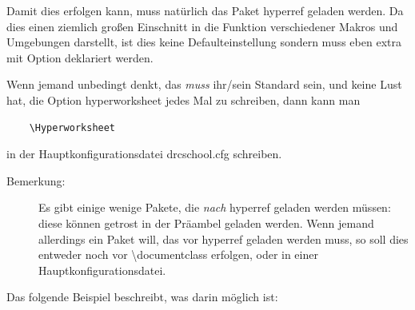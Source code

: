 \documentclass[hyperworksheet,pgfplots]{drcschool}
\newcommand*{\cs}[1]{\textup{\ttfamily\textbackslash#1}}                   %
\newcommand*{\pkg}[1]{\textup{\ttfamily#1}}                                %
\newcommand*{\opt}[1]{\textup{\ttfamily#1}}                                %
\begin{document}
Damit dies erfolgen kann, muss natürlich das Paket \pkg{hyperref} geladen werden.
Da dies einen ziemlich großen Einschnitt in die Funktion verschiedener Makros und Umgebungen
darstellt, ist dies keine Defaulteinstellung sondern muss eben extra mit Option deklariert
werden.

Wenn jemand unbedingt denkt, das \emph{muss} ihr/sein Standard sein, und keine Lust hat,
die Option \opt{hyperworksheet} jedes Mal zu schreiben, dann kann man
\begin{verbatim}
    \Hyperworksheet
\end{verbatim}
in der Hauptkonfigurationsdatei \opt{drcschool.cfg} schreiben.

\begin{description}
\item[Bemerkung:]
Es gibt einige wenige Pakete, die \emph{nach} \pkg{hyperref} geladen werden müssen:
diese können getrost in der Präambel geladen werden. Wenn jemand allerdings ein Paket
will, das vor \pkg{hyperref} geladen werden muss, so soll dies entweder noch vor
\cs{documentclass} erfolgen, oder in einer Hauptkonfigurationsdatei.
\end{description}

Das folgende Beispiel beschreibt, was darin möglich ist:
\end{document}
